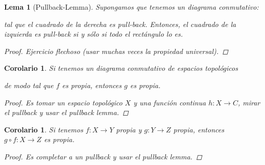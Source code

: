 \documentclass[12pt]{book}
\newtheorem{lem}[teo]{Lema}
\newtheorem{cor}[teo]{Corolario}
\theoremstyle{definition}
\begin{document}
\begin{lem}[Pullback-Lemma]
Supongamos que tenemos un diagrama conmutativo:
\begin{center}
\end{center}
tal que el cuadrado de la derecha es pull-back. Entonces, el cuadrado de la izquierda es pull-back si y sólo si todo el rectángulo lo es.
\begin{proof}
Ejercicio flechoso (usar muchas veces la propiedad universal).
\end{proof}
\end{lem}

\begin{cor}
Si tenemos un diagrama conmutativo de espacios topológicos  \begin{center}
\end{center} de modo tal que $f$ es propia, entonces $g$ es propia.
\begin{proof}
Es tomar un espacio topológico $X$ y una función continua $h:X\to C$, mirar el pullback y usar el pullback lemma.
\end{proof}
\end{cor}

\begin{cor}
Si tenemos $f:X\to Y$ propia y $g:Y\to Z$ propia, entonces $g\circ f:X\to Z$ es propia.
\begin{proof}
Es completar a un pullback y usar el pullback lemma.
\end{proof}
\end{cor}
\end{document}
